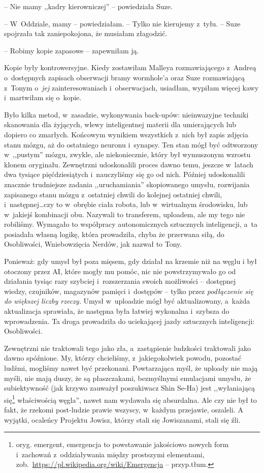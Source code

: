 \documentclass[oneside,polish,11pt,sfheadings]{mwbk}
\begin{document}
-- Nie mamy ,,kadry kierowniczej'' -- powiedziała Suze.

-- W~Oddziale, mamy -- powiedziałam. -- Tylko nie kierujemy z~tyłu. -- Suze
spojrzała tak zaniepokojona, że musiałam złagodzić.

-- Robimy kopie zapasowe -- zapewniłam ją.

Kopie były kontrowersyjne. Kiedy zostawiłam Malleya rozmawiającego z~Andreą o~dostępnych zapisach obserwacji bramy wormhole'a oraz Suze
rozmawiającą z~Tonym o~\textit{jej }zainteresowaniach i~obserwacjach,
usiadłam, wypiłam więcej kawy i~martwiłam się o~kopie.

Było kilka metod, w~zasadzie, wykonywania back-upów: nieinwazyjne
techniki skanowania dla żyjących, wlewy inteligentnej materii dla
umierających lub dopiero co zmarłych. Końcowym wynikiem wszystkich z~nich był zapis zdjęcia stanu mózgu, aż do ostatniego neuronu i~synapsy.
Ten stan mógł być odtworzony w~,,pustym'' mózgu, zwykle, ale
niekoniecznie, który był wymuszonym wzrostu klonem oryginału. Zewnętrzni
udoskonalili proces dawno temu, jeszcze w~latach dwa tysiące
pięćdziesiątych i~nauczyliśmy się go od nich. Później udoskonalili
znacznie trudniejsze zadania ,,uruchamiania'' skopiowanego umysłu,
rozwijania zapisanego stanu mózgu z~ostatniej chwili do kolejnej
ostatniej chwili, i~następnej\ldots  czy to w~obrębie ciała robota, lub w~wirtualnym środowisku, lub w~jakiejś kombinacji obu. Nazywali to
transferem, uploadem, ale my tego nie robiliśmy. Wymagało to współpracy
autonomicznych sztucznych inteligencji, a~ta posiadała własną logikę,
która prowadziła, chyba że przerwana siłą, do Osobliwości, Wniebowzięcia
Nerdów, jak nazwał to Tony.

Ponieważ: gdy umysł był poza mięsem, gdy działał na krzemie niż na węglu
i był otoczony przez AI, które mogły mu pomóc, nic nie powstrzymywało go
od działania tysiąc razy szybciej i~rozszerzania swoich możliwości -- dostępnej wiedzy, czujników, magazynów pamięci i~dostępów -- tylko przez
\textit{podłączenie się do większej liczby rzeczy.} Umysł w~uploadzie mógł
być aktualizowany, a~każda aktualizacja sprawiała, że następna była
łatwiej wykonalna i~szybsza do wprowadzenia. Ta droga prowadziła do
uciekającej jazdy sztucznych inteligencji: Osobliwości.

Zewnętrzni nie traktowali tego jako zła, a~zastąpienie ludzkości
traktowali jako dawno spóźnione. My, którzy chcieliśmy, z~jakiegokolwiek
powodu, pozostać ludźmi, mogliśmy nawet być przekonani. Powtarzająca
myśl, że uploady nie mają myśli, nie mają duszy, że są płaszczakami,
bezmyślnymi emulacjami umysłu, że subiektywność (jak krzywo zauważył
poszukiwacz Shin Se-Ha) jest ,,wyłaniającą się\footnote{ oryg. emergent,
emergencja to powstawanie jakościowo nowych form i~zachowań z~oddziaływania między prostszymi elementami,
zob.~\url{https://pl.wikipedia.org/wiki/Emergencja} -- przyp.tłum.} właściwością węgla'', nawet nam wydawała się absurdalna.
Ale czy nie był to fakt, że rzekomi post-ludzie prawie wszyscy, w~każdym
przejawie, oszaleli. A wyjątki, ocaleńcy Projektu Jowisz, którzy stali
się Jowiszanami, stali się źli.
\end{document}

